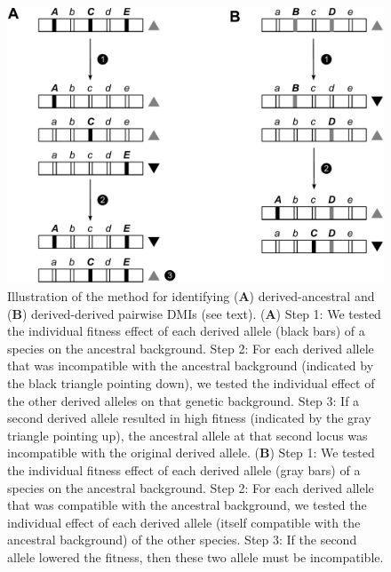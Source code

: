 \begin{doublespace}
\begin{figure}[p]
\begin{center}
\includegraphics[width=5in]{dmi-count-method.pdf}
\end{center}
\caption{Illustration of the method for identifying
  (\textbf{A}) derived-ancestral
  and (\textbf{B}) derived-derived pairwise DMIs (see text).
  (\textbf{A}) Step 1: We tested the individual fitness effect
  of each derived allele (black bars) of a species on the ancestral background.
  Step 2: For each derived allele that
  was incompatible with the ancestral background
  (indicated by the black triangle pointing down),
  we tested the individual effect of the other derived alleles
  on that genetic background.
  Step 3: If a second derived allele resulted in high fitness
  (indicated by the gray triangle pointing up),
  the ancestral allele at that second locus
  was incompatible with the original derived allele.
  (\textbf{B}) Step 1: We tested the individual fitness effect
  of each derived allele (gray bars) of a species on the ancestral background.
  Step 2: For each derived allele that
  was compatible with the ancestral background,
  we tested the individual effect of each derived allele
  (itself compatible with the ancestral background) of the other species.
  Step 3: If the second allele lowered the fitness,
  then these two allele must be incompatible.}
\label{dmi-count-method}
\end{figure}




\end{doublespace}

